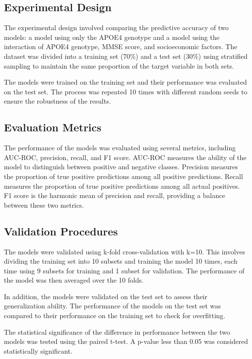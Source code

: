 \documentclass[conference]{IEEEtran}
\begin{document}
\subsection{Experimental Design}

The experimental design involved comparing the predictive accuracy of two models: a model using only the APOE4 genotype and a model using the interaction of APOE4 genotype, MMSE score, and socioeconomic factors. The dataset was divided into a training set (70\%) and a test set (30\%) using stratified sampling to maintain the same proportion of the target variable in both sets.

The models were trained on the training set and their performance was evaluated on the test set. The process was repeated 10 times with different random seeds to ensure the robustness of the results.

\subsection{Evaluation Metrics}

The performance of the models was evaluated using several metrics, including AUC-ROC, precision, recall, and F1 score. AUC-ROC measures the ability of the model to distinguish between positive and negative classes. Precision measures the proportion of true positive predictions among all positive predictions. Recall measures the proportion of true positive predictions among all actual positives. F1 score is the harmonic mean of precision and recall, providing a balance between these two metrics.

\subsection{Validation Procedures}

The models were validated using k-fold cross-validation with k=10. This involves dividing the training set into 10 subsets and training the model 10 times, each time using 9 subsets for training and 1 subset for validation. The performance of the model was then averaged over the 10 folds.

In addition, the models were validated on the test set to assess their generalization ability. The performance of the models on the test set was compared to their performance on the training set to check for overfitting.

The statistical significance of the difference in performance between the two models was tested using the paired t-test. A p-value less than 0.05 was considered statistically significant.
\end{document}
